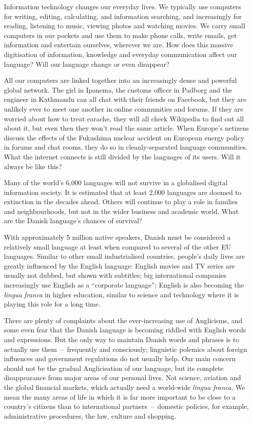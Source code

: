 \begin{multicols}{2}
Information technology changes our everyday lives. We typically use
computers for writing, editing, calculating, and information
searching, and increasingly for reading, listening to music, viewing
photos and watching movies. We carry small computers in our pockets
and use them to make phone calls, write emails, get information and
entertain ourselves, wherever we are. How does this massive
digitisation of information, knowledge and everyday communication
affect our language? Will our language change or even disappear?

All our computers are linked together into an increasingly dense and
powerful global network. The girl in Ipanema, the customs officer in
Padborg and the engineer in Kathmandu can all chat with their friends
on Facebook, but they are unlikely ever to meet one another in online
communities and forums. If they are worried about how to treat
earache, they will all check Wikipedia to find out all about it, but
even then they won't read the same article. When Europe's netizens
discuss the effects of the Fukushima nuclear accident on European
energy policy in forums and chat rooms, they do so in
cleanly-separated language communities. What the internet connects is
still divided by the languages of its users. Will it always be like
this?

Many of the world's 6,000 languages will not survive in a globalised
digital information society. It is estimated that at least 2,000
languages are doomed to extinction in the decades ahead. Others will
continue to play a role in families and neighbourhoods, but not in the
wider business and academic world. What are the Danish language's
chances of survival?

With approximately 5 million native speakers, Danish must be
considered a relatively small language at least when compared to
several of the other EU languages. Similar to other small
industrialised countries, people's daily lives are greatly influenced
by the English language: English movies and TV series are usually not
dubbed, but shown with subtitles; big international companies
increasingly use English as a ``corporate language''; English is
also becoming the {\it lingua franca} in higher education, similar to
science and technology where it is playing this role for a long time.

There are plenty of complaints about the ever-increasing use of
Anglicisms, and some even fear that the Danish language is becoming
riddled with English words and expressions. But the only way to
maintain Danish words and phrases is to actually use
them~--~frequently and consciously; linguistic polemics about foreign
influences and government regulations do not usually help. Our main
concern should not be the gradual Anglicisation of our language, but
its complete disappearance from major areas of our personal lives. Not
science, aviation and the global financial markets, which actually
need a world-wide {\it lingua franca}. We mean the many areas of life in
which it is far more important to be close to a country's citizens
than to international partners~--~domestic policies, for example,
administrative procedures, the law, culture and shopping.


\end{multicols}
